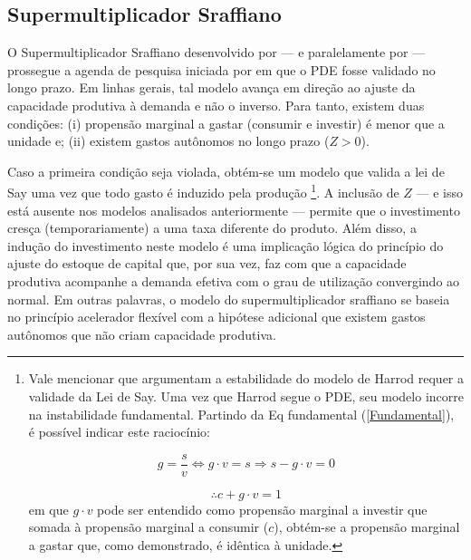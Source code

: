 \subsection{Supermultiplicador Sraffiano}\label{SecSuper}




O Supermultiplicador Sraffiano desenvolvido por \textcite{serrano_sraffian_1995} --- e paralelamente por \textcite{bortis_institutions_1996} --- prossegue a agenda de pesquisa iniciada por \textcite{garegnani_problem_2015} em que o PDE fosse validado no longo prazo.  Em linhas gerais, tal modelo avança em direção ao ajuste da capacidade produtiva à demanda e não o inverso.
Para tanto, existem duas condições: (i) propensão marginal a gastar (consumir e investir) é menor que a unidade e; (ii) existem gastos autônomos no longo prazo ($Z > 0$).


Caso a primeira condição seja violada, obtém-se um modelo que valida a lei de Say uma vez que todo gasto é induzido pela produção \cite[p.~ 75]{serrano_sraffian_1995}\footnote{
	Vale mencionar que \textcite{serrano_trouble_2017} argumentam a estabilidade do modelo de Harrod requer a validade da Lei de Say. Uma vez que Harrod segue o PDE, seu modelo incorre na instabilidade fundamental. Partindo da Eq fundamental (\ref{Fundamental}), é possível indicar este raciocínio:
	
	$$
	g = \frac{s}{v} \Leftrightarrow g\cdot v = s \Rightarrow s - g\cdot v = 0
	$$
	
	$$
	\therefore c + g\cdot v = 1
	$$
	em que $g\cdot v$ pode ser entendido como propensão marginal a investir que somada à propensão marginal a consumir ($c$), obtém-se a propensão marginal a gastar que, como demonstrado, é idêntica à unidade.
}.
A inclusão de $Z$ --- e isso está ausente nos modelos analisados anteriormente --- permite que o investimento cresça (temporariamente) a uma taxa diferente do produto.
Além disso, a indução do investimento neste modelo é uma implicação lógica do princípio do ajuste do estoque de capital que, por sua vez, faz com que a capacidade produtiva acompanhe a demanda efetiva com o grau de utilização convergindo ao normal. 
Em outras palavras, o modelo do supermultiplicador sraffiano se baseia no princípio acelerador flexível com a hipótese adicional que existem gastos autônomos que não criam capacidade produtiva. 


